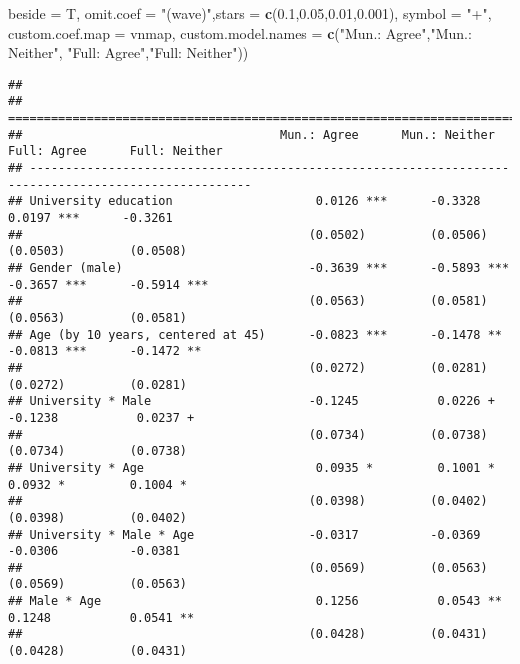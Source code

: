 \documentclass[
]{article}
\newenvironment{Shaded}{\begin{snugshade}}{\end{snugshade}}
\newcommand{\DataTypeTok}[1]{\textcolor[rgb]{0.13,0.29,0.53}{#1}}
\newcommand{\FloatTok}[1]{\textcolor[rgb]{0.00,0.00,0.81}{#1}}
\newcommand{\KeywordTok}[1]{\textcolor[rgb]{0.13,0.29,0.53}{\textbf{#1}}}
\newcommand{\NormalTok}[1]{#1}
\newcommand{\StringTok}[1]{\textcolor[rgb]{0.31,0.60,0.02}{#1}}
\begin{document}
\begin{Shaded}
\begin{Highlighting}[]
          \DataTypeTok{beside =}\NormalTok{ T,}
          \DataTypeTok{omit.coef =} \StringTok{"(wave)"}\NormalTok{,}\DataTypeTok{stars =} \KeywordTok{c}\NormalTok{(}\FloatTok{0.1}\NormalTok{,}\FloatTok{0.05}\NormalTok{,}\FloatTok{0.01}\NormalTok{,}\FloatTok{0.001}\NormalTok{), }\DataTypeTok{symbol =} \StringTok{"+"}\NormalTok{,}
          \DataTypeTok{custom.coef.map =}\NormalTok{ vnmap,}
          \DataTypeTok{custom.model.names =} \KeywordTok{c}\NormalTok{(}\StringTok{"Mun.: Agree"}\NormalTok{,}\StringTok{"Mun.: Neither"}\NormalTok{,}
                                 \StringTok{"Full: Agree"}\NormalTok{,}\StringTok{"Full: Neither"}\NormalTok{))}
\end{Highlighting}
\end{Shaded}

\begin{verbatim}
## 
## =====================================================================================================
##                                    Mun.: Agree      Mun.: Neither    Full: Agree      Full: Neither  
## -----------------------------------------------------------------------------------------------------
## University education                    0.0126 ***      -0.3328           0.0197 ***      -0.3261    
##                                        (0.0502)         (0.0506)         (0.0503)         (0.0508)   
## Gender (male)                          -0.3639 ***      -0.5893 ***      -0.3657 ***      -0.5914 ***
##                                        (0.0563)         (0.0581)         (0.0563)         (0.0581)   
## Age (by 10 years, centered at 45)      -0.0823 ***      -0.1478 **       -0.0813 ***      -0.1472 ** 
##                                        (0.0272)         (0.0281)         (0.0272)         (0.0281)   
## University * Male                      -0.1245           0.0226 +        -0.1238           0.0237 +  
##                                        (0.0734)         (0.0738)         (0.0734)         (0.0738)   
## University * Age                        0.0935 *         0.1001 *         0.0932 *         0.1004 *  
##                                        (0.0398)         (0.0402)         (0.0398)         (0.0402)   
## University * Male * Age                -0.0317          -0.0369          -0.0306          -0.0381    
##                                        (0.0569)         (0.0563)         (0.0569)         (0.0563)   
## Male * Age                              0.1256           0.0543 **        0.1248           0.0541 ** 
##                                        (0.0428)         (0.0431)         (0.0428)         (0.0431)   

\end{verbatim}
\end{document}
